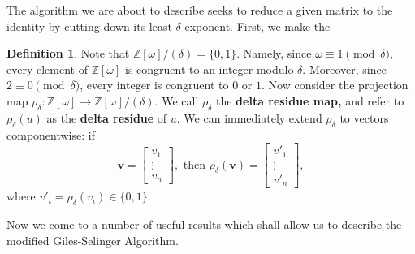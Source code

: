 \documentclass{dalthesis}
\theoremstyle{theorem}
\theoremstyle{definition}
\newtheorem{definition}[theorem]{Definition}
\theoremstyle{definition}  %
\theoremstyle{definition}
\newcommand{\Z}{\mathbb{Z}}
\renewcommand{\:}{\mathbin{:}}
\begin{document}
The algorithm we are about to describe seeks to reduce a given matrix to the identity by cutting down its least $\delta$-exponent. First, we make the

\begin{definition}
\label{DeltaResidueDef}
Note that $\Z[\omega]/(\delta) = \{0,1\}$. Namely, since $\omega\equiv 1\pmod{\delta}$, every element of $\Z[\omega]$ is congruent to an integer modulo $\delta$. Moreover, since $2\equiv 0\pmod{\delta}$, every integer is congruent to $0$ or $1$. Now consider the projection map $\rho_\delta\:\Z[\omega]\rightarrow\Z[\omega]/(\delta).$ We call $\rho_\delta$ the \textbf{delta residue map,} and refer to $\rho_\delta(u)$ as the \textbf{delta residue} of $u.$ We can immediately extend $\rho_\delta$ to vectors componentwise: if \[\boldsymbol{v} = \begin{bmatrix}
v_1\\
\vdots\\
v_n
\end{bmatrix},
\mbox{ then }
\rho_\delta(\boldsymbol{v}) = \begin{bmatrix}
v'_1\\
\vdots\\
v'_n
\end{bmatrix},
\]
where $v'_\iota = \rho_{\delta}(v_\iota)\in\{0,1\}.$
\end{definition}

Now we come to a number of useful results which shall allow us to describe the modified Giles-Selinger Algorithm.
\end{document}
